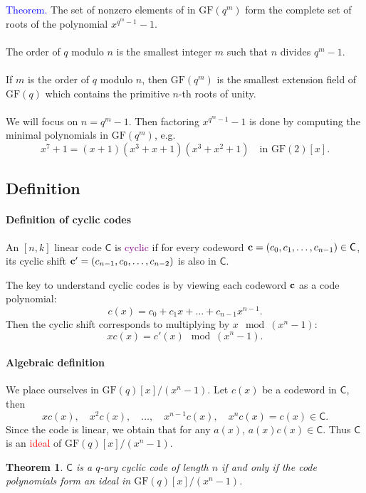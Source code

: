 \documentclass[a4paper, 11pt, openany]{book}
\numberwithin{equation}{section}
\theoremstyle{plain}
\newtheorem{theorem}	[equation]	{Theorem}
\theoremstyle{definition}
\newcommand{\GF}{\mathrm{GF}}
\newcommand{\Important}[1]{\textcolor{red}{#1}}
\newcommand{\Structure}[1]{\textcolor{blue}{#1}}
\newcommand{\Define}[1]{\textcolor{purple}{#1}}
\newcommand{\code}[1]{\mathsf{#1}}
\begin{document}
\Structure{Theorem.} The set of nonzero elements of in $\GF(q^m)$ form the complete set of roots of the polynomial $x^{q^m - 1} - 1$.\\
~\\
The order of $q$ modulo $n$ is the smallest integer $m$ such that $n$ divides $q^m - 1$.\\
~\\
If $m$ is the order of $q$ modulo $n$, then $\GF(q^m)$ is the smallest extension field of $\GF(q)$ which contains the primitive $n$-th roots of unity.\\
~\\
We will focus on $n = q^m-1$. Then factoring $x^{q^m - 1} - 1$ is done by computing the minimal polynomials in $\GF(q^m)$, e.g.
\[
	x^7 + 1 = (x+1)(x^3 + x + 1)(x^3 + x^2 + 1) \quad \text{in } \GF(2)[x].
\]





\subsection{Definition}


\paragraph{Definition of cyclic codes}
An $[n,k]$ linear code $\code{C}$ is \Define{cyclic} if for every codeword ${\bf c} = (c_0, c_1, \dots, c_{n-1}) \in \code{C}$, its cyclic shift ${\bf c}' = (c_{n-1}, c_0, \dots, c_{n-2})$ is also in $\code{C}$.

The key to understand cyclic codes is by viewing each codeword ${\bf c}$ as a code polynomial:
\[
	c(x) = c_0 + c_1 x + \dots + c_{n-1} x^{n-1}.
\]
Then the cyclic shift corresponds to multiplying by $x \mod (x^n-1)$:
\[
	x c(x) = c'(x) \mod (x^n - 1).
\]



\paragraph{Algebraic definition}
We place ourselves in $\GF(q)[x] / (x^n - 1)$. Let $c(x)$ be a codeword in $\code{C}$, then 
\[
	x c(x), \quad x^2 c(x), \quad \dots, \quad x^{n-1} c(x), \quad x^n c(x) = c(x) \in \code{C}.
\]
Since the code is linear, we obtain that for any $a(x)$, $a(x)c(x) \in \code{C}$. Thus $\code{C}$ is an \Important{ideal} of $\GF(q)[x] / (x^n - 1)$.

\begin{theorem} 
$\code{C}$ is a $q$-ary cyclic code of length $n$ if and only if the code polynomials form an ideal in $\GF(q)[x] / (x^n - 1)$.
\end{theorem}
\end{document}
